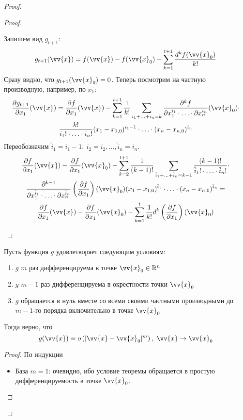 \begin{proof}
\begin{proof}
\begin{itemize}
			Запишем вид $g_{t + 1}$:
			\[
				g_{t + 1}(\vv{x}) = f(\vv{x}) - f(\vv{x}_0) - \suml_{k = 1}^{t + 1} \frac{d^k f(\vv{x}_0)}{k!}
			\]
			Сразу видно, что $g_{t + 1} (\vv{x}_0) = 0$. Теперь посмотрим на частную производную, например, по $x_1$:
			\begin{multline*}
				\pd{g_{t + 1}}{x_1} (\vv{x}) = \pd{f}{x_1} (\vv{x}) - \suml_{k = 1}^{t + 1} \frac{1}{k!} \suml_{i_1 + \ldots + i_n = k} \frac{\vdelta^k f}{\vdelta x_1^{i_1} \cdot \ldots \cdot \vdelta x_n^{i_n}} (\vv{x}_0) \cdot
				\\
				\frac{k!}{i_1! \cdot \ldots \cdot i_n!} (x_1 - x_{1, 0})^{i_1 - 1} \cdot \ldots \cdot (x_n - x_{n, 0})^{i_n}
			\end{multline*}
			Переобозначим $\hat{i}_1 = i_1 - 1,\ \hat{i}_2 = i_2,\ldots, \hat{i}_n = i_n$.
			\begin{multline*}
				\pd{f}{x_1} (\vv{x}) - \pd{f}{x_1} (\vv{x}_0) - \suml_{k = 2}^{t + 1} \frac{1}{(k - 1)!} \suml_{\hat{i}_1 + \ldots + \hat{i}_n = k - 1} \frac{(k - 1)!}{\hat{i}_1! \cdot \ldots \cdot \hat{i}_n!} \cdot
				\\
				\frac{\vdelta^{k - 1}}{\vdelta x_1^{\hat{i}_1} \cdot \ldots \cdot \vdelta x_n^{\hat{i}_n}} \left(\pd{f}{x_1}\right) (\vv{x}_0) (x_1 - x_{1, 0})^{\hat{i}_1} \cdot \ldots \cdot (x_n - x_{n, 0})^{\hat{i}_n} =
				\\
				\pd{f}{x_1} (\vv{x}) - \pd{f}{x_1} (\vv{x}_0) - \suml_{k = 1}^t \frac{1}{k!} d^k \left(\pd{f}{x_1}\right) (\vv{x}_0)
			\end{multline*}
		\end{itemize}
	\end{proof}
	\begin{lemma}
		Пусть функция $g$ удовлетворяет следующим условиям:
		\begin{enumerate}
			\item $g$ $m$ раз дифференцируема в точке $\vv{x}_0 \in \R^n$
			
			\item $g$ $m - 1$ раз дифференцируема в окрестности точки $\vv{x}_0$
			
			\item $g$ обращается в нуль вместе со всеми своими частными производными до $m - 1$-го порядка включительно в точке $\vv{x}_0$
		\end{enumerate}
		Тогда верно, что
		\[
			g(\vv{x}) = o\left(|\vv{x} - \vv{x}_0|^m\right),\ \vv{x} \to \vv{x}_0
		\]
	\end{lemma}
	
	\begin{proof}
		По индукции
		\begin{itemize}
			\item База $m = 1$: очевидно, ибо условие теоремы обращается в простую дифференцируемость в точке $\vv{x}_0$.
			

\end{itemize}
\end{proof}
\end{proof}
